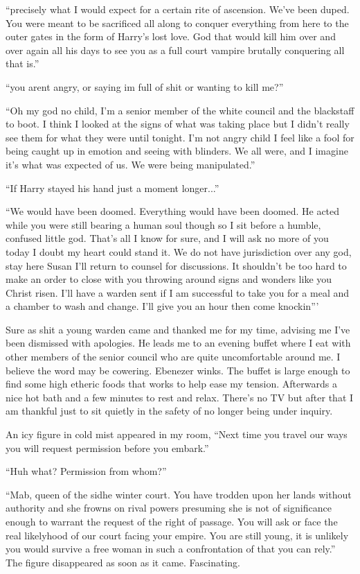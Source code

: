 ``precisely what I would expect for a certain rite of ascension. We've been duped. You were meant to be sacrificed all along to conquer everything from here to the outer gates in the form of Harry's lost love. God that would kill him over and over again all his days to see you as a full court vampire brutally conquering all that is.''

``you arent angry, or saying im full of shit or wanting to kill me?''

``Oh my god no child, I'm a senior member of the white council and the blackstaff to boot. I think I looked at the signs of what was taking place but I didn't really see them for what they were until tonight. I'm not angry child I feel like a fool for being caught up in emotion and seeing with blinders. We all were, and I imagine it's what was expected of us. We were being manipulated.''

``If Harry stayed his hand just a moment longer...''

``We would have been doomed. Everything would have been doomed. He acted while you were still bearing a human soul though so I sit before a humble, confused little god. That's all I know for sure, and I will ask no more of you today I doubt my heart could stand it. We do not have jurisdiction over any god, stay here Susan I'll return to counsel for discussions. It shouldn't be too hard to make an order to close with you throwing around signs and wonders like you Christ risen. I'll have a warden sent if I am successful to take you for a meal and a chamber to wash and change. I'll give you an hour then come knockin'''

Sure as shit a young warden came and thanked me for my time, advising me I've been dismissed with apologies. He leads me to an evening buffet where I eat with other members of the senior council who are quite uncomfortable around me. I believe the word may be cowering. Ebenezer winks. The buffet is large enough to find some high etheric foods that works to help ease my tension. Afterwards a nice hot bath and a few minutes to rest and relax. There's no TV but after that I am thankful just to sit quietly in the safety of no longer being under inquiry.

An icy figure in cold mist appeared in my room, ``Next time you travel our ways you will request permission before you embark.''

``Huh what? Permission from whom?''

``Mab, queen of the sidhe winter court. You have trodden upon her lands without authority and she frowns on rival powers presuming she is not of significance enough to warrant the request of the right of passage. You will ask or face the real likelyhood of our court facing your empire. You are still young, it is unlikely you would survive a free woman in such a confrontation of that you can rely.'' The figure disappeared as soon as it came. Fascinating.

